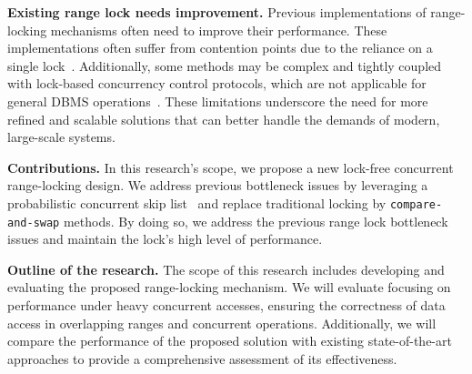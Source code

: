 \textbf{Existing range lock needs improvement.}
Previous implementations of range-locking mechanisms often need to improve their performance. These implementations often suffer from contention points due to the reliance on a single lock~\parencite{linuxRangeLockImpl2013, song2013parallelizing}. Additionally, some methods may be complex and tightly coupled with lock-based concurrency control protocols, which are not applicable for general DBMS operations~\parencite{graefe2007hierarchical, andy2022database}. These limitations underscore the need for more refined and scalable solutions that can better handle the demands of modern, large-scale systems.

\textbf{Contributions.} In this research's scope, we propose a new lock-free concurrent range-locking design.
We address previous bottleneck issues by leveraging a probabilistic concurrent skip list~\parencite{herlihy2006provably, herlihy2020art} and replace traditional locking by \texttt{compare-and-swap} methods. 
By doing so, we address the previous range lock bottleneck issues and maintain the lock's high level of performance.

\textbf{Outline of the research.} The scope of this research includes developing and evaluating the proposed range-locking mechanism. We will evaluate focusing on performance under heavy concurrent accesses, ensuring the correctness of data access in overlapping ranges and concurrent operations. Additionally, we will compare the performance of the proposed solution with existing state-of-the-art approaches to provide a comprehensive assessment of its effectiveness.
